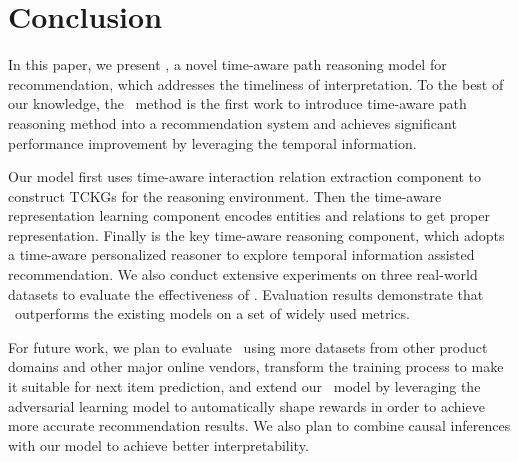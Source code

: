 \section{Conclusion}
\label{sec:conclusion}

In this paper, we present \tkgrec, a novel 
time-aware path reasoning model for recommendation, which addresses the timeliness of
interpretation.
To the best of our knowledge, the \tkgrec\ method is the first work to
introduce time-aware path reasoning method into a recommendation
system and achieves significant performance improvement by leveraging the
temporal information.
%
%

Our model first uses time-aware interaction relation extraction component to
construct TCKGs for the
reasoning environment. Then the time-aware representation learning component encodes 
entities and relations to get proper
representation. Finally is the key time-aware reasoning component, which adopts a 
time-aware
personalized reasoner to explore temporal information assisted recommendation.
%
We also conduct extensive experiments on three real-world datasets to evaluate
the effectiveness of \tkgrec. Evaluation results demonstrate that \tkgrec\
outperforms the existing models on a set of widely used metrics.

For future work, we plan to evaluate \tkgrec\ using more datasets from other
product domains and other major online vendors, transform the training process 
to make it suitable for next item prediction,
and extend our \tkgrec\ model
by leveraging the adversarial learning model to automatically shape rewards in
order to achieve more accurate recommendation results.  We also plan to combine
causal inferences with our model to achieve better interpretability.
